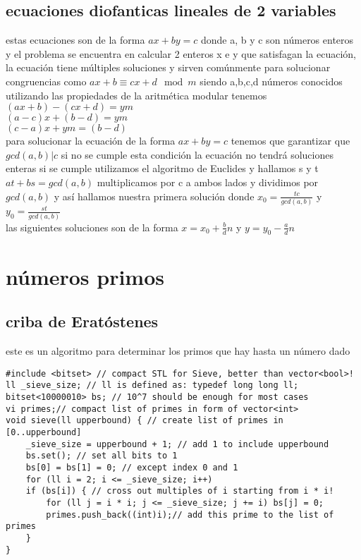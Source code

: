 \documentclass[11pt,a4paper]{book}
\begin{document}
\subsection{ecuaciones diofanticas lineales de 2 variables }
estas ecuaciones son de la forma $ax+by=c$ donde a, b y c son números enteros y el problema se encuentra en calcular
2 enteros x e y que satisfagan la ecuación, la ecuación tiene múltiples soluciones y sirven comúnmente para solucionar congruencias como $ax+b\equiv cx+d \mod{m}$ siendo a,b,c,d números conocidos utilizando las propiedades de la aritmética modular tenemos\\  
$(ax+b)-(cx+d)=ym$\\
$(a-c)x+(b-d)=ym$\\
$(c-a)x+ym=(b-d)$\\
para solucionar la ecuación de la forma $ax+by=c$  tenemos que garantizar que $gcd(a,b)|c$
si no se cumple esta condición la ecuación no tendrá soluciones enteras
si  se cumple utilizamos el algoritmo de Euclides  y hallamos s y t $at+bs=gcd(a,b)$
multiplicamos por c a ambos lados y dividimos por $gcd(a,b)$ y así hallamos nuestra primera solución 
donde $x_{0}=\frac{tc}{gcd(a,b)}$ y $y_{0}=\frac{st}{gcd(a,b)}$ \\
las siguientes soluciones son de la forma $x = x_{0} + \frac{b}{d}n$ y $y = y_{0} - \frac{a}{d}n$
\section{números primos}
\subsection{criba de Eratóstenes}
este es un algoritmo para determinar los primos que hay hasta un número dado
\begin{lstlisting}[style=C] 
#include <bitset> // compact STL for Sieve, better than vector<bool>!
ll _sieve_size; // ll is defined as: typedef long long ll;
bitset<10000010> bs; // 10^7 should be enough for most cases
vi primes;// compact list of primes in form of vector<int>
void sieve(ll upperbound) { // create list of primes in [0..upperbound]
	_sieve_size = upperbound + 1; // add 1 to include upperbound
	bs.set(); // set all bits to 1
	bs[0] = bs[1] = 0; // except index 0 and 1
	for (ll i = 2; i <= _sieve_size; i++) 
	if (bs[i]) { // cross out multiples of i starting from i * i!
		for (ll j = i * i; j <= _sieve_size; j += i) bs[j] = 0;
		primes.push_back((int)i);// add this prime to the list of primes
	} 
}
\end{lstlisting}
\end{document}
